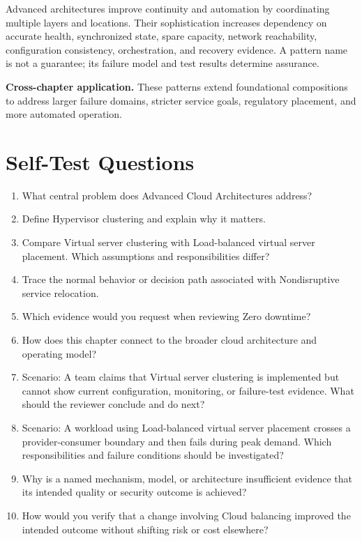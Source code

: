 \documentclass[11pt]{article}
\begin{document}
\begin{synthesisbox}
Advanced architectures improve continuity and automation by coordinating multiple layers and locations. Their sophistication increases dependency on accurate health, synchronized state, spare capacity, network reachability, configuration consistency, orchestration, and recovery evidence. A pattern name is not a guarantee; its failure model and test results determine assurance.
\par\smallskip
\textbf{Cross-chapter application.} These patterns extend foundational compositions to address larger failure domains, stricter service goals, regulatory placement, and more automated operation.
\end{synthesisbox}
\section{Self-Test Questions}
\begin{enumerate}
\item What central problem does Advanced Cloud Architectures address?
\item Define Hypervisor clustering and explain why it matters.
\item Compare Virtual server clustering with Load-balanced virtual server placement. Which assumptions and responsibilities differ?
\item Trace the normal behavior or decision path associated with Nondisruptive service relocation.
\item Which evidence would you request when reviewing Zero downtime?
\item How does this chapter connect to the broader cloud architecture and operating model?
\item Scenario: A team claims that Virtual server clustering is implemented but cannot show current configuration, monitoring, or failure-test evidence. What should the reviewer conclude and do next?
\item Scenario: A workload using Load-balanced virtual server placement crosses a provider-consumer boundary and then fails during peak demand. Which responsibilities and failure conditions should be investigated?
\item Why is a named mechanism, model, or architecture insufficient evidence that its intended quality or security outcome is achieved?
\item How would you verify that a change involving Cloud balancing improved the intended outcome without shifting risk or cost elsewhere?
\end{enumerate}
\clearpage
\end{document}
